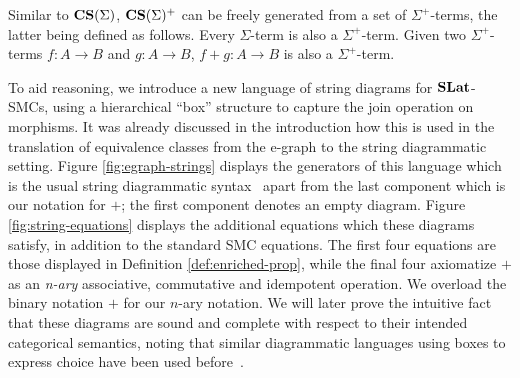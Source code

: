 Similar to $\mathbf{CS}(\Sigma)$, $\mathbf{CS}(\Sigma)^{+}$ can be freely generated from a set of $\Sigma^{+}$-terms, the latter being defined as follows.
Every $\Sigma$-term is also a $\Sigma^{+}$-term. 
Given two $\Sigma^{+}$-terms $f : A \to B$ and $g : A \to B$, $f + g : A \to B$ is also a $\Sigma^{+}$-term.


To aid reasoning, we introduce a new language of string diagrams for $\mathbf{SLat}$-SMCs, using a hierarchical ``box'' structure to capture the join operation on morphisms.  It was already discussed in the introduction how this is  used in the translation of equivalence classes from the e-graph to the string diagrammatic setting. 
Figure \ref{fig:egraph-strings} displays the generators of this language which is the usual string diagrammatic syntax~\cite{Selinger_2010} apart from the last component which is our notation for $+$; the first component denotes an empty diagram. 
Figure \ref{fig:string-equations} displays the additional equations which these diagrams satisfy, in addition to the standard SMC equations. 
The first four equations are those displayed in Definition \ref{def:enriched-prop},  while the final four axiomatize $+$ as an \textit{n-ary} associative, commutative and idempotent operation.  We overload the binary notation $+$ for our $n$-ary notation.  
We will later prove the intuitive fact that these diagrams are sound and complete with respect to their intended categorical semantics, noting that similar diagrammatic languages using boxes to express choice have been used before~\cite{duncan_generalised_2009}. 
